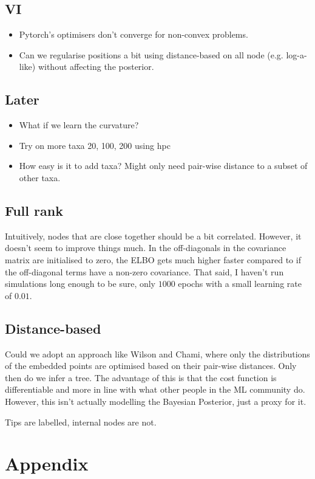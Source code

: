 \documentclass[11pt]{article}
\begin{document}
\subsection{VI}
\begin{itemize}
\item Pytorch's optimisers don't converge for non-convex problems.
\item Can we regularise positions a bit using distance-based on all node (e.g. log-a-like) without affecting the posterior.
\end{itemize}

\subsection{Later}
\begin{itemize}
\item What if we learn the curvature?
\item Try on more taxa 20, 100, 200 using hpc
\item How easy is it to add taxa? Might only need pair-wise distance to a subset of other taxa.
\end{itemize}

\subsection{Full rank}
Intuitively, nodes that are close together should be a bit correlated. However, it doesn't seem to improve things much. In the off-diagonals in the covariance matrix are initialised to zero, the ELBO gets much higher faster compared to if the off-diagonal terms have a non-zero covariance. That said, I haven't run simulations long enough to be sure, only $1000$ epochs with a small learning rate of $0.01$.

\subsection{Distance-based}
Could we adopt an approach like Wilson and Chami, where only the distributions of the embedded points are optimised based on their pair-wise distances.
Only then do we infer a tree.
The advantage of this is that the cost function is differentiable and more in line with what other people in the ML community do.
However, this isn't actually modelling the Bayesian Posterior, just a proxy for it.

Tips are labelled, internal nodes are not.

\section{Appendix}
\end{document}

